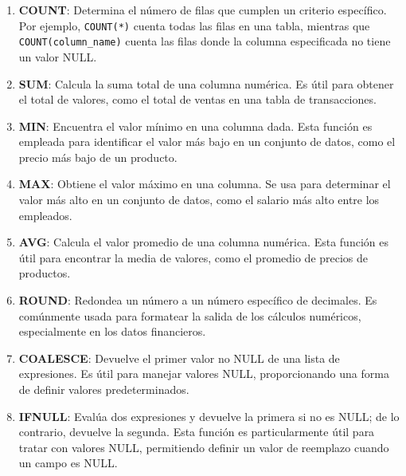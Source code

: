             \begin{enumerate}
                \item \textbf{COUNT}: Determina el número de filas que cumplen un criterio específico. Por ejemplo, \texttt{COUNT(*)} cuenta todas las filas en una tabla, mientras que \texttt{COUNT(column\_name)} cuenta las filas donde la columna especificada no tiene un valor NULL.
                
                \item \textbf{SUM}: Calcula la suma total de una columna numérica. Es útil para obtener el total de valores, como el total de ventas en una tabla de transacciones.
                
                \item \textbf{MIN}: Encuentra el valor mínimo en una columna dada. Esta función es empleada para identificar el valor más bajo en un conjunto de datos, como el precio más bajo de un producto.
                
                \item \textbf{MAX}: Obtiene el valor máximo en una columna. Se usa para determinar el valor más alto en un conjunto de datos, como el salario más alto entre los empleados.
                
                \item \textbf{AVG}: Calcula el valor promedio de una columna numérica. Esta función es útil para encontrar la media de valores, como el promedio de precios de productos.
                
                \item \textbf{ROUND}: Redondea un número a un número específico de decimales. Es comúnmente usada para formatear la salida de los cálculos numéricos, especialmente en los datos financieros.
                
                \item \textbf{COALESCE}: Devuelve el primer valor no NULL de una lista de expresiones. Es útil para manejar valores NULL, proporcionando una forma de definir valores predeterminados.
                
                \item \textbf{IFNULL}: Evalúa dos expresiones y devuelve la primera si no es NULL; de lo contrario, devuelve la segunda. Esta función es particularmente útil para tratar con valores NULL, permitiendo definir un valor de reemplazo cuando un campo es NULL.
            \end{enumerate}
        